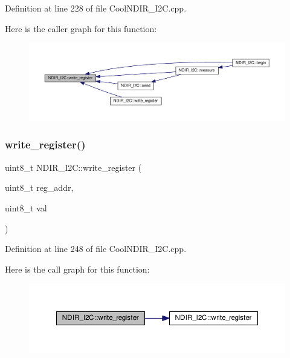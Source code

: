 Definition at line 228 of file Cool\+N\+D\+I\+R\+\_\+\+I2\+C.\+cpp.

Here is the caller graph for this function\+:\nopagebreak
\begin{figure}[H]
\begin{center}
\leavevmode
\includegraphics[width=350pt]{class_n_d_i_r___i2_c_a5de6a044b00e985f035edca07521e319_icgraph}
\end{center}
\end{figure}
\mbox{\label{class_n_d_i_r___i2_c_a8ad2a76f9866b0a1f34810a147b4b20d}} 
\subsubsection{\texorpdfstring{write\+\_\+register()}{write\_register()}\hspace{0.1cm}{\footnotesize\ttfamily [2/2]}}
{\footnotesize\ttfamily uint8\+\_\+t N\+D\+I\+R\+\_\+\+I2\+C\+::write\+\_\+register (\begin{DoxyParamCaption}\item[{uint8\+\_\+t}]{reg\+\_\+addr,  }\item[{uint8\+\_\+t}]{val }\end{DoxyParamCaption})\hspace{0.3cm}{\ttfamily [private]}}



Definition at line 248 of file Cool\+N\+D\+I\+R\+\_\+\+I2\+C.\+cpp.

Here is the call graph for this function\+:\nopagebreak
\begin{figure}[H]
\begin{center}
\leavevmode
\includegraphics[width=350pt]{class_n_d_i_r___i2_c_a8ad2a76f9866b0a1f34810a147b4b20d_cgraph}
\end{center}
\end{figure}


